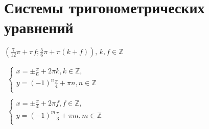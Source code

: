\documentclass{article}
\begin{document}
 
	


\section*{Системы тригонометрических уравнений}
\begin{enumerate}
	{$\left(\frac{7}{12}\pi+\pi f; \frac{5}{6}\pi+\pi \left(k+f \right)\right)\!, \,k, f \in \mathds{Z}$}
	
	{$
		\begin{array}{ll}
			\left \{ 
				\begin{array}{ll}
 					x = \pm \frac{\pi}{6} + 2\pi k, k \in \mathds{Z}, \\
 					y = \left(-1\right)^{n} \frac{\pi}{4} + \pi n, n \in \mathds{Z}\\
  				\end{array}
  			\right. \\
 			\\
  			\left\{ 
  				\begin{array}{ll}
 					x = \pm \frac{\pi}{4} + 2\pi f, f \in \mathds{Z}, \\
 					y = \left(-1\right)^{m} \frac{\pi}{3} + \pi m, m \in \mathds{Z}\\
  				\end{array}
  			\right.
		\end{array}
	$}
\end{enumerate}
\end{document}
